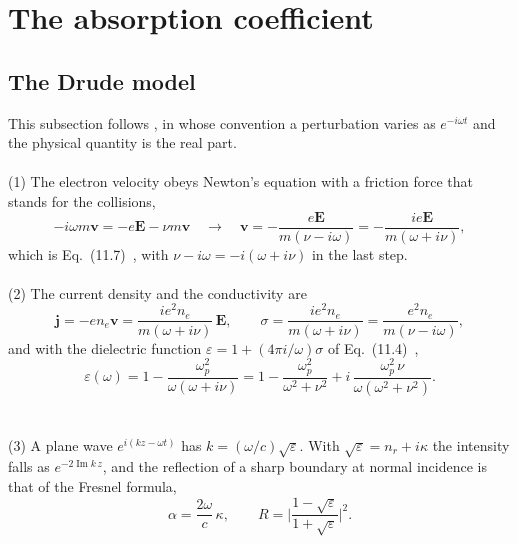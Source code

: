 \documentclass[11pt]{article}
\numberwithin{equation}{section}
\newcommand{\Ev}{\mathbf E}
\newcommand{\vv}{\mathbf v}
\newcommand{\jv}{\mathbf j}
\DeclareMathOperator{\Imag}{Im}
\begin{document}
\section{The absorption coefficient}
\label{sec:absorption}

\subsection{The Drude model}
\label{sec:drude}
This subsection follows \cite[Sec.~11.1.1]{Atzeni2004}, in whose convention a
perturbation varies as $e^{-i\omega t}$ and the physical quantity is the real part.
\\ \\
{\noindent}(1) The electron velocity obeys Newton's equation with a friction force that
stands for the collisions,
\begin{equation}
-i\omega m\vv=-e\Ev-\nu m\vv
\quad\longrightarrow\quad
\vv=-\frac{e\Ev}{m(\nu-i\omega)}=-\frac{ie\Ev}{m(\omega+i\nu)},
\label{eq:drude-newton}
\end{equation}
which is Eq.~(11.7)~\cite{Atzeni2004}, with $\nu-i\omega=-i(\omega+i\nu)$ in the last step.
\\ \\
{\noindent}(2) The current density and the conductivity are
\begin{equation}
\jv=-en_e\vv=\frac{ie^2n_e}{m(\omega+i\nu)}\,\Ev,\qquad
\sigma=\frac{ie^2n_e}{m(\omega+i\nu)}=\frac{e^2n_e}{m(\nu-i\omega)},
\label{eq:drude-sigma}
\end{equation}
and with the dielectric function $\varepsilon=1+(4\pi i/\omega)\sigma$ of
Eq.~(11.4)~\cite{Atzeni2004},
\begin{equation}
\boxed{\;\varepsilon(\omega)=1-\frac{\omega_p^2}{\omega(\omega+i\nu)}
=1-\frac{\omega_p^2}{\omega^2+\nu^2}+i\,\frac{\omega_p^2\,\nu}{\omega(\omega^2+\nu^2)}.\;}
\label{eq:drude-eps}
\end{equation}
\\ \\
{\noindent}(3) A plane wave $e^{i(kz-\omega t)}$ has $k=(\omega/c)\sqrt\varepsilon$. With
$\sqrt\varepsilon=n_r+i\kappa$ the intensity falls as $e^{-2\Imag k\,z}$, and the
reflection of a sharp boundary at normal incidence is that of the Fresnel formula,
\begin{equation}
\boxed{\;\alpha=\frac{2\omega}{c}\,\kappa,\qquad
R=\Big|\frac{1-\sqrt\varepsilon}{1+\sqrt\varepsilon}\Big|^2.\;}
\label{eq:optics}
\end{equation}
\end{document}
